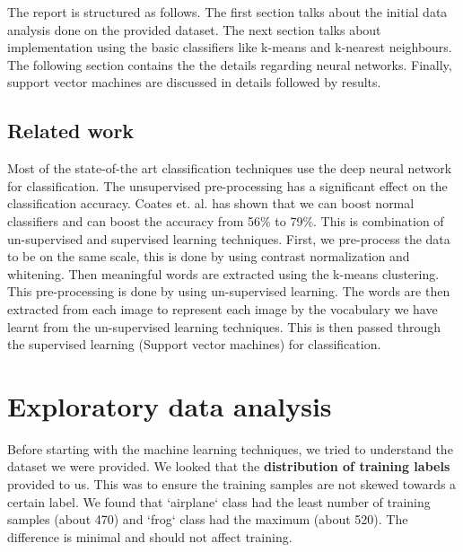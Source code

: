 \documentclass{article} %
\begin{document}
The report is structured as follows. The first section talks about the initial data analysis done on the provided dataset. The next section talks about implementation using the basic classifiers like k-means and k-nearest neighbours. The following section contains the the details regarding neural networks. Finally, support vector machines are discussed in details followed by results.

\subsection{Related work}
Most of the state-of-the art classification techniques use the deep neural network for classification. The unsupervised pre-processing has a significant effect on the classification accuracy. Coates et. al. \cite{andrew} has shown that we can boost normal classifiers and can boost the accuracy from 56\% to 79\%. This is combination of un-supervised and supervised learning techniques. First, we pre-process the data to be on the same scale, this is done by using contrast normalization and whitening. Then meaningful words are extracted using the k-means clustering. This pre-processing is done by using un-supervised learning. The words are then extracted from each image to represent each image by the vocabulary we have learnt from the un-supervised learning techniques. This is then passed through the supervised learning (Support vector machines) for classification.

\section{Exploratory data analysis}
    Before starting with the machine learning techniques, we tried to understand the dataset we were provided. We looked that the \textbf{distribution of training labels} provided to us. This was to ensure the training samples are not skewed towards a certain label. We found that `airplane` class had the least number of training samples (about 470) and `frog` class had the maximum (about 520). The difference is minimal and should not affect training.
\end{document}
